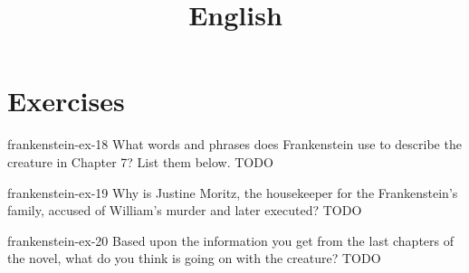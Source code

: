 \documentclass[preview]{standalone}
\begin{document}
\title{English}
\genpage

\section{Exercises}

\begin{snippetexercise}{frankenstein-ex-18}
    { What words and phrases does Frankenstein use to describe the creature in Chapter 7? List them
    below.}
    TODO 
\end{snippetexercise}

\begin{snippetexercise}{frankenstein-ex-19}
    {Why is Justine Moritz, the housekeeper for the Frankenstein's family, accused
    of William's murder and later executed?}
    TODO 
\end{snippetexercise}

\begin{snippetexercise}{frankenstein-ex-20}
    {Based upon the information you get from the last chapters of the novel, what do you think is
    going on with the creature?}
    TODO 
\end{snippetexercise}
\end{document}
